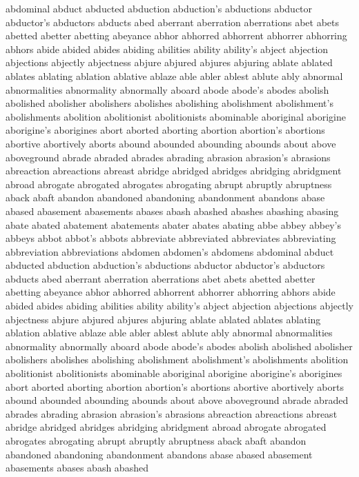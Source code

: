 \documentclass [PhD] {uclathes}
\begin{document}
abdominal
abduct
abducted
abduction
abduction's
abductions
abductor
abductor's
abductors
abducts
abed
aberrant
aberration
aberrations
abet
abets
abetted
abetter
abetting
abeyance
abhor
abhorred
abhorrent
abhorrer
abhorring
abhors
abide
abided
abides
abiding
abilities
ability
ability's
abject
abjection
abjections
abjectly
abjectness
abjure
abjured
abjures
abjuring
ablate
ablated
ablates
ablating
ablation
ablative
ablaze
able
abler
ablest
ablute
ably
abnormal
abnormalities
abnormality
abnormally
aboard
abode
abode's
abodes
abolish
abolished
abolisher
abolishers
abolishes
abolishing
abolishment
abolishment's
abolishments
abolition
abolitionist
abolitionists
abominable
aboriginal
aborigine
aborigine's
aborigines
abort
aborted
aborting
abortion
abortion's
abortions
abortive
abortively
aborts
abound
abounded
abounding
abounds
about
above
aboveground
abrade
abraded
abrades
abrading
abrasion
abrasion's
abrasions
abreaction
abreactions
abreast
abridge
abridged
abridges
abridging
abridgment
abroad
abrogate
abrogated
abrogates
abrogating
abrupt
abruptly
abruptness
aback
abaft
abandon
abandoned
abandoning
abandonment
abandons
abase
abased
abasement
abasements
abases
abash
abashed
abashes
abashing
abasing
abate
abated
abatement
abatements
abater
abates
abating
abbe
abbey
abbey's
abbeys
abbot
abbot's
abbots
abbreviate
abbreviated
abbreviates
abbreviating
abbreviation
abbreviations
abdomen
abdomen's
abdomens
abdominal
abduct
abducted
abduction
abduction's
abductions
abductor
abductor's
abductors
abducts
abed
aberrant
aberration
aberrations
abet
abets
abetted
abetter
abetting
abeyance
abhor
abhorred
abhorrent
abhorrer
abhorring
abhors
abide
abided
abides
abiding
abilities
ability
ability's
abject
abjection
abjections
abjectly
abjectness
abjure
abjured
abjures
abjuring
ablate
ablated
ablates
ablating
ablation
ablative
ablaze
able
abler
ablest
ablute
ably
abnormal
abnormalities
abnormality
abnormally
aboard
abode
abode's
abodes
abolish
abolished
abolisher
abolishers
abolishes
abolishing
abolishment
abolishment's
abolishments
abolition
abolitionist
abolitionists
abominable
aboriginal
aborigine
aborigine's
aborigines
abort
aborted
aborting
abortion
abortion's
abortions
abortive
abortively
aborts
abound
abounded
abounding
abounds
about
above
aboveground
abrade
abraded
abrades
abrading
abrasion
abrasion's
abrasions
abreaction
abreactions
abreast
abridge
abridged
abridges
abridging
abridgment
abroad
abrogate
abrogated
abrogates
abrogating
abrupt
abruptly
abruptness
aback
abaft
abandon
abandoned
abandoning
abandonment
abandons
abase
abased
abasement
abasements
abases
abash
abashed
\end{document}
